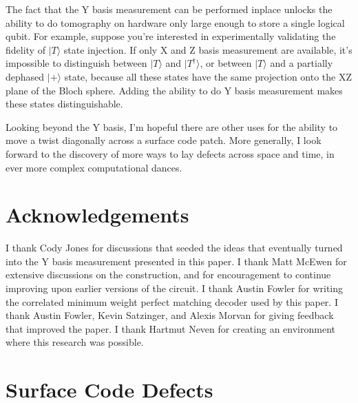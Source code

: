 \documentclass[onecolumn,unpublished,a4paper]{quantumarticle}
\theoremstyle{definition}
\theoremstyle{definition}
\theoremstyle{definition}
\begin{document}
The fact that the Y basis measurement can be performed inplace unlocks the ability to do tomography on hardware only large enough to store a single logical qubit.
For example, suppose you're interested in experimentally validating the fidelity of $|T\rangle$ state injection.
If only X and Z basis measurement are available, it's impossible to distinguish between $|T\rangle$ and $|T^\dagger\rangle$, or between $|T\rangle$ and a partially dephased $|+\rangle$ state, because all these states have the same projection onto the XZ plane of the Bloch sphere.
Adding the ability to do Y basis measurement makes these states distinguishable.

Looking beyond the Y basis, I'm hopeful there are other uses for the ability to move a twist diagonally across a surface code patch.
More generally, I look forward to the discovery of more ways to lay defects across space and time, in ever more complex computational dances.

\section{Acknowledgements}

I thank Cody Jones for discussions that seeded the ideas that eventually turned into the Y basis measurement presented in this paper.
I thank Matt McEwen for extensive discussions on the construction, and for encouragement to continue improving upon earlier versions of the circuit.
I thank Austin Fowler for writing the correlated minimum weight perfect matching decoder used by this paper.
I thank Austin Fowler, Kevin Satzinger, and Alexis Morvan for giving feedback that improved the paper.
I thank Hartmut Neven for creating an environment where this research was possible.

\printbibliography

\appendix

\section{Surface Code Defects}
\label{app:defects}
\end{document}
